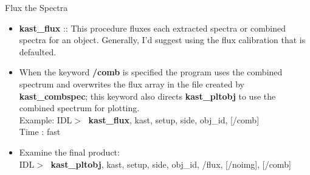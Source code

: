 \documentclass[11pt,letterpaper,dvips]{article}
\begin{document}
\begin{enumerate}
{\Large  \item Flux the Spectra}
  \begin{itemize}
	\item {\bf kast\_flux} ::
	This procedure fluxes each extracted spectra or combined spectra 
	for an object.  Generally,
	I'd suggest using the flux calibration that is defaulted. \\
	\item When the keyword {\bf /comb} is specified the program uses the 
	combined spectrum and overwrites the flux array in the file created by
	{\bf kast\_combspec}; this keyword also directs {\bf kast\_pltobj} 
	to use the combined spectrum for plotting. \\
         \quad Example: IDL$> \;$ {\bf kast\_flux}, kast, setup, side, obj\_id, [/comb] \\
         \quad Time   : fast \\
	\item Examine the final product: \\
         \quad IDL$> \;$ {\bf kast\_pltobj}, kast, setup, side, obj\_id, /flux,
		 [/noimg], [/comb] \\
  \end{itemize}

\end{enumerate}

\clearpage
\end{document}
